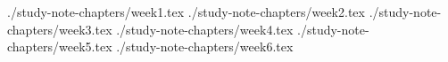 \documentclass[10pt,a4paper,oneside]{report}
\begin{document}
\maketitle

\setcounter{tocdepth}{5}
\tableofcontents

 {./study-note-chapters/week1.tex}
 {./study-note-chapters/week2.tex}
 {./study-note-chapters/week3.tex}
 {./study-note-chapters/week4.tex}
 {./study-note-chapters/week5.tex}
 {./study-note-chapters/week6.tex}
\end{document}
